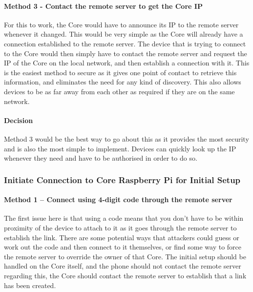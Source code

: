 \paragraph{Method 3 - Contact the remote server to get the Core IP} For this to work, the Core would have to announce its IP to the remote server whenever it changed. This would be very simple as the Core will already have a connection established to the remote server. The device that is trying to connect to the Core would then simply have to contact the remote server and request the IP of the Core on the local network, and then establish a connection with it. This is the easiest method to secure as it gives one point of contact to retrieve this information, and eliminates the need for any kind of discovery. This also allows devices to be as far away from each other as required if they are on the same network.

\paragraph{Decision}
Method 3 would be the best way to go about this as it provides the most security and is also the most simple to implement. Devices can quickly look up the IP whenever they need and have to be authorised in order to do so.

\subsubsection{Initiate Connection to Core Raspberry Pi for Initial Setup}

\paragraph{Method 1 – Connect using 4-digit code through the remote server}
The first issue here is that using a code means that you don’t have to be within proximity of the device to attach to it as it goes through the remote server to establish the link. There are some potential ways that attackers could guess or work out the code and then connect to it themselves, or find some way to force the remote server to override the owner of that Core. The initial setup should be handled on the Core itself, and the phone should not contact the remote server regarding this, the Core should contact the remote server to establish that a link has been created.

